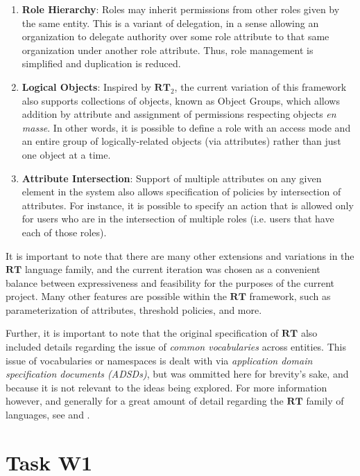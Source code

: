 \documentclass{article}
\providecommand{\task}[1]{\section{Task #1}}
\providecommand{\RT}{\textbf{RT}}
\begin{document}
\begin{itemize}
\begin{enumerate}
    \item \textbf{Role Hierarchy}: Roles may inherit permissions from other roles given by the same entity. This is a variant of delegation, in a sense allowing an organization to delegate authority over some role attribute to that same organization under another role attribute. Thus, role management is simplified and duplication is reduced.
    \item \textbf{Logical Objects}: Inspired by $\RT_2$, the current variation of this framework also supports collections of objects, known as Object Groups, which allows addition by attribute and assignment of permissions respecting objects \textit{en masse}. In other words, it is possible to define a role with an access mode and an entire group of logically-related objects (via attributes) rather than just one object at a time.
    \item \textbf{Attribute Intersection}: Support of multiple attributes on any given element in the system also allows specification of policies by intersection of attributes. For instance, it is possible to specify an action that is allowed only for users who are in the intersection of multiple roles (i.e. users that have each of those roles).
  \end{enumerate}
\end{itemize}
It is important to note that there are many other extensions and variations in the $\RT$ language family, and the current iteration was chosen as a convenient balance between expressiveness and feasibility for the purposes of the current project. Many other features are possible within the $\RT$ framework, such as parameterization of attributes, threshold policies, and more. \par
Further, it is important to note that the original specification of $\RT$ also included details regarding the issue of \textit{common vocabularies} across entities. This issue of vocabularies or namespaces is dealt with via \textit{application domain specification documents (ADSDs)}, but was ommitted here for brevity's sake, and because it is not relevant to the ideas being explored. For more information however, and generally for a great amount of detail regarding the $\RT$ family of languages, see \cite{RTmain} and \cite{RTold}.


\task{W1}
\end{document}
